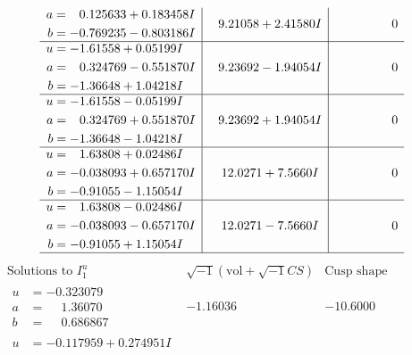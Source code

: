 \documentclass[1p]{elsarticle_modified}
\theoremstyle{definition}
\newcommand{\I}{\sqrt{-1}}
\begin{document}
$$\begin{array}{c|c|c}
\begin{aligned}
a &= \phantom{-}0.125633 + 0.183458 I \\
b &= -0.769235 - 0.803186 I\end{aligned}
 & \phantom{-}9.21058 + 2.41580 I & \phantom{-0.000000 } 0 \\ \hline\begin{aligned}
u &= -1.61558 + 0.05199 I \\
a &= \phantom{-}0.324769 - 0.551870 I \\
b &= -1.36648 + 1.04218 I\end{aligned}
 & \phantom{-}9.23692 - 1.94054 I & \phantom{-0.000000 } 0 \\ \hline\begin{aligned}
u &= -1.61558 - 0.05199 I \\
a &= \phantom{-}0.324769 + 0.551870 I \\
b &= -1.36648 - 1.04218 I\end{aligned}
 & \phantom{-}9.23692 + 1.94054 I & \phantom{-0.000000 } 0 \\ \hline\begin{aligned}
u &= \phantom{-}1.63808 + 0.02486 I \\
a &= -0.038093 + 0.657170 I \\
b &= -0.91055 - 1.15054 I\end{aligned}
 & \phantom{-}12.0271 + 7.5660 I & \phantom{-0.000000 } 0 \\ \hline\begin{aligned}
u &= \phantom{-}1.63808 - 0.02486 I \\
a &= -0.038093 - 0.657170 I \\
b &= -0.91055 + 1.15054 I\end{aligned}
 & \phantom{-}12.0271 - 7.5660 I & \phantom{-0.000000 } 0\\
 \hline 
 \end{array}$$\newpage$$\begin{array}{c|c|c}  
\text{Solutions to }I^u_{1}& \I (\text{vol} + \sqrt{-1}CS) & \text{Cusp shape}\\
 \hline 
\begin{aligned}
u &= -0.323079\phantom{ +0.000000I} \\
a &= \phantom{-}1.36070\phantom{ +0.000000I} \\
b &= \phantom{-}0.686867\phantom{ +0.000000I}\end{aligned}
 & -1.16036\phantom{ +0.000000I} & -10.6000\phantom{ +0.000000I} \\ \hline\begin{aligned}
u &= -0.117959 + 0.274951 I \\

\end{aligned}
\end{array}$$
\end{document}
